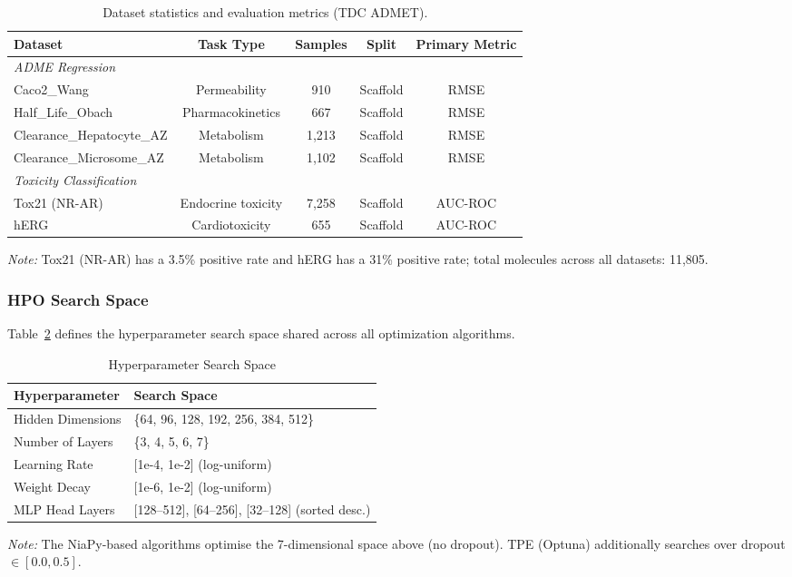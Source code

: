 \documentclass[12pt]{article}
\begin{document}
\begin{table}[htbp]
\centering
\caption{Dataset statistics and evaluation metrics (TDC ADMET).}
\label{tab:dataset_stats}
\small
\begin{tabular}{lcccc}
\toprule
\textbf{Dataset} & \textbf{Task Type} & \textbf{Samples} & \textbf{Split} & \textbf{Primary Metric} \\
\midrule
\multicolumn{5}{l}{\emph{ADME Regression}} \\
\midrule
Caco2\_Wang & Permeability & 910 & Scaffold & RMSE \\
Half\_Life\_Obach & Pharmacokinetics & 667 & Scaffold & RMSE \\
Clearance\_Hepatocyte\_AZ & Metabolism & 1,213 & Scaffold & RMSE \\
Clearance\_Microsome\_AZ & Metabolism & 1,102 & Scaffold & RMSE \\
\midrule
\multicolumn{5}{l}{\emph{Toxicity Classification}} \\
\midrule
Tox21 (NR-AR) & Endocrine toxicity & 7,258 & Scaffold & AUC-ROC \\
hERG & Cardiotoxicity & 655 & Scaffold & AUC-ROC \\
\bottomrule
\end{tabular}

\noindent\textit{Note:} Tox21 (NR-AR) has a 3.5\% positive rate and hERG has a 31\% positive rate; total molecules across all datasets: 11{,}805.
\end{table}



\subsubsection{HPO Search Space}
Table~\ref{tab:search_space} defines the hyperparameter search space shared across all optimization algorithms.

\begin{table}[ht]
\centering
\caption{Hyperparameter Search Space}
\begin{tabular}{ll}
\hline
\textbf{Hyperparameter} & \textbf{Search Space} \\
\hline
Hidden Dimensions & \{64, 96, 128, 192, 256, 384, 512\} \\
Number of Layers & \{3, 4, 5, 6, 7\} \\
Learning Rate & [1e-4, 1e-2] (log-uniform) \\
Weight Decay & [1e-6, 1e-2] (log-uniform) \\
MLP Head Layers & [128--512], [64--256], [32--128] (sorted desc.) \\
\hline
\end{tabular}

\vspace{0.5em}
\textit{Note:} The NiaPy-based algorithms optimise the 7-dimensional space above (no dropout). TPE (Optuna) additionally searches over dropout $\in [0.0, 0.5]$.
\label{tab:search_space}
\end{table}
\end{document}
